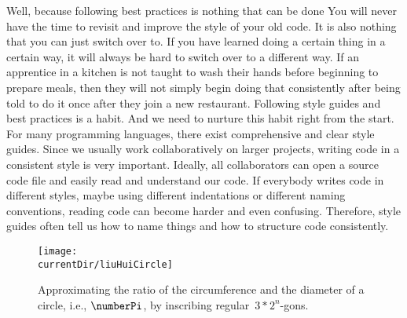 Well, because following best practices is nothing that can be done 
You will never have the time to revisit and improve the style of your old code.
It is also nothing that you can just switch over to.
If you have learned doing a certain thing in a certain way, it will always be hard to switch over to a different way.
If an apprentice in a kitchen is not taught to wash their hands before beginning to prepare meals, then they will not simply begin doing that consistently after being told to do it once after they join a new restaurant.
Following style guides and best practices is a habit.
And we need to nurture this habit right from the start.%
%
%
%
For many programming languages, there exist comprehensive and clear style guides.
Since we usually work collaboratively on larger projects, writing code in a consistent style is very important.
Ideally, all collaborators can open a source code file and easily read and understand our code.
If everybody writes code in different styles, maybe using different indentations or different naming conventions, reading code can become harder and even confusing.
Therefore, style guides often tell us how to name things and how to structure code consistently.%
%
%
%
\FloatBarrier%
\endhsection%
%
%
\label{sec:approximatePiLiuHui}%
%
\begin{figure}%
\centering%
\texttt{[image: \\currentDir/liuHuiCircle]}%
\caption{Approximating the ratio of the circumference and the diameter of a circle, i.e., $\numberPi$, by inscribing regular~$3*2^n$-gons.}%
\label{fig:liuHuiCircle}%
\end{figure}%
%
%
\def\liuhuir{\ensuremath{{\color{liuhui-r-color}r}}}%
%
\def\liuhuiss{\ensuremath{{\color{liuhui-s6-color}s_6}}}%
%
\def\liuhuist{\ensuremath{{\color{liuhui-s12-color}s_{12}}}}%
%
\def\liuhuiy{\ensuremath{{\color{liuhui-y-color}y}}}%
